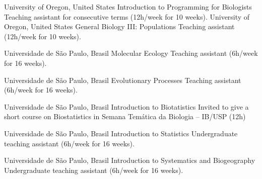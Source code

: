 		{%
			University of Oregon, United States
        }
		{%
		    Introduction to Programming for Biologists
        }
		{%
		    Teaching assistant for consecutive terms (12h/week for 10 weeks).
        }
		{%
			University of Oregon, United States
        }
		{%
		    General Biology III: Populations
        }
		{%
		    Teaching assistant (12h/week for 10 weeks).
        }

		{%
			Universidade de São Paulo, Brasil
        }
		{%
		    Molecular Ecology
        }
		{%
		    Teaching assistant (6h/week for 16 weeks).
        }

		{%
			Universidade de São Paulo, Brasil
        }
		{%
		    Evolutionary Processes
        }
		{%
		    Teaching assistant (6h/week for 16 weeks).
        }

		{%
			Universidade de São Paulo, Brasil
        }
		{%
		    Introduction to Biotatistics
        }
		{%
		    Invited to give a short course on Biostatistics in Semana Temática da Biologia -- IB/USP (12h)
        }

		{%
			Universidade de São Paulo, Brasil
        }
		{%
		    Introduction to Statistics
        }
		{%
		    Undergraduate teaching assistant (6h/week for 16 weeks).
        }

		{%
			Universidade de São Paulo, Brasil
        }
		{%
		    Introduction to Systematics and Biogeography	
        }
		{%
		    Undergraduate teaching assistant (6h/week for 16 weeks).
        }

